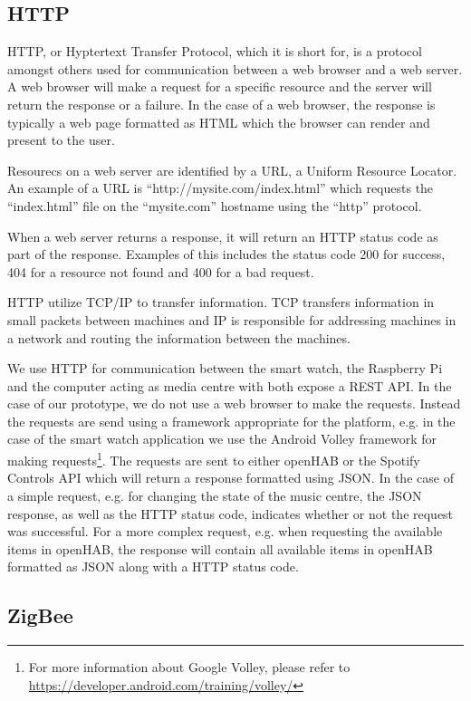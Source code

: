 \subsection{HTTP}

HTTP, or Hyptertext Transfer Protocol, which it is short for, is a protocol amongst others used for communication between a web browser and a web server. A web browser will make a request for a specific resource and the server will return the response or a failure. In the case of a web browser, the response is typically a web page formatted as HTML which the browser can render and present to the user.

Resourecs on a web server are identified by a URL, a Uniform Resource Locator. An example of a URL is ``http://mysite.com/index.html'' which requests the ``index.html'' file on the ``mysite.com'' hostname using the ``http'' protocol.

When a web server returns a response, it will return an HTTP status code as part of the response. Examples of this includes the status code 200 for success, 404 for a resource not found and 400 for a bad request.

HTTP utilize TCP/IP to transfer information. TCP transfers information in small packets between machines and IP is responsible for addressing machines in a network and routing the information between the machines.

We use HTTP for communication between the smart watch, the Raspberry Pi and the computer acting as media centre with both expose a REST API. In the case of our prototype, we do not use a web browser to make the requests. Instead the requests are send using a framework appropriate for the platform, e.g. in the case of the smart watch application we use the Android Volley framework for making requests\footnote{For more information about Google Volley, please refer to \url{https://developer.android.com/training/volley/}}.
The requests are sent to either openHAB or the Spotify Controls API which will return a response formatted using JSON. In the case of a simple request, e.g. for changing the state of the music centre, the JSON response, as well as the HTTP status code, indicates whether or not the request was successful. For a more complex request, e.g. when requesting the available items in openHAB, the response will contain all available items in openHAB formatted as JSON along with a HTTP status code.

\subsection{ZigBee}

